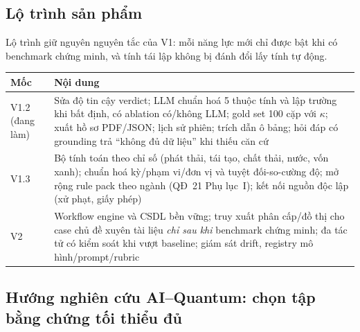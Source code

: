 \documentclass[11pt,a4paper]{article}
\begin{document}
\subsection{Lộ trình sản phẩm}

Lộ trình giữ nguyên nguyên tắc của V1: mỗi năng lực mới chỉ được bật khi có benchmark chứng minh, và tính tái lập không bị đánh đổi lấy tính tự động.

\begin{table}[!htbp]\small
\begin{tabularx}{\linewidth}{L{2.2cm} X}
\toprule
\textbf{Mốc} & \textbf{Nội dung} \\
\midrule
V1.2 (đang làm) & Sửa độ tin cậy verdict; LLM chuẩn hoá 5 thuộc tính và lập trường khi bất định, có ablation có/không LLM; gold set 100 cặp với $\kappa$; xuất hồ sơ PDF/JSON; lịch sử phiên; trích dẫn ô bảng; hỏi đáp có grounding trả ``không đủ dữ liệu'' khi thiếu căn cứ \\
V1.3 & Bộ tính toán theo chỉ số (phát thải, tái tạo, chất thải, nước, vốn xanh); chuẩn hoá kỳ/phạm vi/đơn vị và tuyệt đối-so-cường độ; mở rộng rule pack theo ngành (QĐ~21 Phụ lục~I); kết nối nguồn độc lập (xử phạt, giấy phép) \\
V2 & Workflow engine và CSDL bền vững; truy xuất phân cấp/đồ thị cho case chủ đề xuyên tài liệu \emph{chỉ sau khi} benchmark chứng minh; đa tác tử có kiểm soát khi vượt baseline; giám sát drift, registry mô hình/prompt/rubric \\
\bottomrule
\end{tabularx}
\end{table}

\subsection{Hướng nghiên cứu AI--Quantum: chọn tập bằng chứng tối thiểu đủ}
\end{document}
